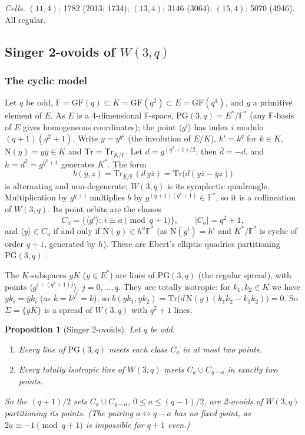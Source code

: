 \documentclass[11pt]{amsart}
\newtheorem{proposition}[theorem]{Proposition}
\theoremstyle{definition}
\theoremstyle{remark}
\numberwithin{equation}{section}
\newcommand{\F}{\mathbb F}
\newcommand{\PG}{\mathrm{PG}}
\newcommand{\GF}{\mathrm{GF}}
\newcommand{\Tr}{\mathrm{Tr}}
\newcommand{\Nm}{\mathrm{N}}
\begin{document}
\noindent\emph{Cells.} $(11,4)$: 1782 (2013: 1734); $(13,4)$: 3146 (3064); $(15,4)$: 5070 (4946). All regular.

\subsection{Singer 2-ovoids of $W(3,q)$}

\subsubsection*{The cyclic model}
Let $q$ be odd, $\F=\GF(q)\subset K=\GF(q^2)\subset E=\GF(q^4)$, and $g$ a primitive element of $E$. As $E$ is a
4-dimensional $\F$-space, $\PG(3,q)=E^*/\F^*$ (any $\F$-basis of $E$ gives homogeneous coordinates); the point $\langle
g^i\rangle$ has index $i$ modulo $(q+1)(q^2+1)$. Write $\bar y=y^{q^2}$ (the involution of $E/K$), $k'=k^q$ for $k\in K$,
$\Nm(y)=y\bar y\in K$ and $\Tr=\Tr_{K/\F}$. Let $d=g^{(q^2+1)/2}$; then $\bar d=-d$, and $h=d^2=g^{q^2+1}$ generates
$K^*$. The form
\[
b(y,z)=\Tr_{E/\F}(d\,y\bar z)=\Tr\bigl(d(y\bar z-\bar yz)\bigr)
\]
is alternating and non-degenerate; $W(3,q)$ is its symplectic quadrangle. Multiplication by $g^{q+1}$ multiplies $b$ by
$g^{(q+1)(q^2+1)}\in\F^*$, so it is a collineation of $W(3,q)$. Its point orbits are the classes
\[
C_a=\{\langle g^i\rangle:\ i\equiv a\pmod{q+1}\},\qquad |C_a|=q^2+1,
\]
and $\langle y\rangle\in C_a$ if and only if $\Nm(y)\in h^a\F^*$ (as $\Nm(g^i)=h^i$ and $K^*/\F^*$ is cyclic of order
$q+1$, generated by $h$). These are Ebert's elliptic quadrics partitioning $\PG(3,q)$ \cite{E85}.

The $K$-subspaces $yK$ ($y\in E^*$) are lines of $\PG(3,q)$ (the regular spread), with points
$\langle g^{i+(q^2+1)j}\rangle$, $j=0,\dots,q$. They are totally isotropic: for $k_1,k_2\in K$ we have
$\overline{yk_i}=\bar yk_i$ (as $\bar k=k^{q^2}=k$), so $b(yk_1,yk_2)=\Tr\bigl(d\,\Nm(y)(k_1k_2-k_1k_2)\bigr)=0$.
So $\Sigma=\{yK\}$ is a spread of $W(3,q)$ with $q^2+1$ lines.

\begin{proposition}[Singer 2-ovoids]\label{prop:C}
Let $q$ be odd.
\begin{enumerate}[label=(\alph*)]
\item Every line of $\PG(3,q)$ meets each class $C_a$ in at most two points.
\item Every totally isotropic line of $W(3,q)$ meets $C_a\cup C_{q-a}$ in exactly two points.
\end{enumerate}
So the $(q+1)/2$ sets $C_a\cup C_{q-a}$, $0\le a\le(q-1)/2$, are 2-ovoids of $W(3,q)$ partitioning its points. (The pairing
$a\leftrightarrow q-a$ has no fixed point, as $2a\equiv-1\pmod{q+1}$ is impossible for $q+1$ even.)
\end{proposition}
\end{document}

